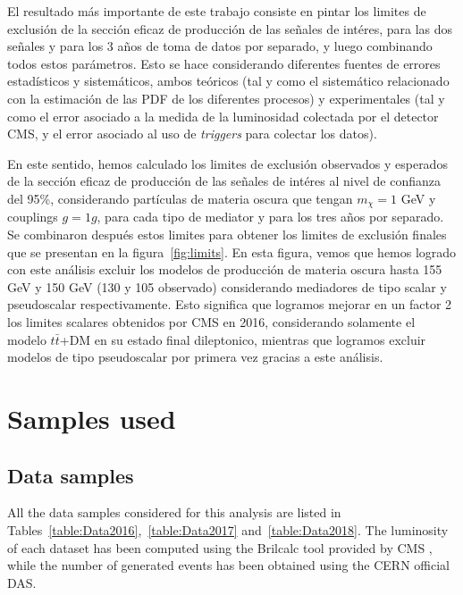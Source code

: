 \documentclass[a4paper, 10pt, openright]{report}
\begin{document}
\begin{appendices}
El resultado m\'{a}s importante de este trabajo consiste en pintar los limites de exclusi\'{o}n de la secci\'{o}n eficaz de producci\'{o}n de las se\~{n}ales de int\'{e}res, para las dos se\~{n}ales y para los 3 a\~{n}os de toma de datos por separado, y luego combinando todos estos par\'{a}metros. Esto se hace considerando diferentes fuentes de errores estad\'{i}sticos y sistem\'{a}ticos, ambos te\'{o}ricos (tal y como el sistem\'{a}tico relacionado con la estimaci\'{o}n de las \ac{PDF} de los diferentes procesos) y experimentales (tal y como el error asociado a la medida de la luminosidad colectada por el detector \ac{CMS}, y el error asociado al uso de \textit{triggers} para colectar los datos).

En este sentido, hemos calculado los limites de exclusi\'{o}n observados y esperados de la secci\'{o}n eficaz de producci\'{o}n de las se\~{n}ales de int\'{e}res al nivel de confianza del 95\%, considerando part\'{i}culas de materia oscura que tengan $m_\chi = 1$ GeV y couplings $g = 1g$, para cada tipo de mediator y para los tres a\~{n}os por separado. Se combinaron despu\'{e}s estos limites para obtener los limites de exclusi\'{o}n finales que se presentan en la figura~\ref{fig:limits}. En esta figura, vemos que hemos logrado con este an\'{a}lisis excluir los modelos de producci\'{o}n de materia oscura hasta 155 GeV y 150 GeV (130 y 105 observado) considerando mediadores de tipo scalar y pseudoscalar respectivamente. Esto significa que logramos mejorar en un factor 2 los limites scalares obtenidos por \ac{CMS} en 2016, considerando solamente el modelo $t \bar t$+DM en su estado final dileptonico, mientras que logramos excluir modelos de tipo pseudoscalar por primera vez gracias a este an\'{a}lisis.




\chapter{Samples used} \label{appendix:Samples}
\section{Data samples} \label{appendix:DataSamples}

All the data samples considered for this analysis are listed in Tables~\ref{table:Data2016},~\ref{table:Data2017} and~\ref{table:Data2018}. The luminosity of each dataset has been computed using the Brilcalc tool provided by \ac{CMS} \cite{Brilcalc}, while the number of generated events has been obtained using the CERN official \acf{DAS}.


\end{appendices}
\end{document}
